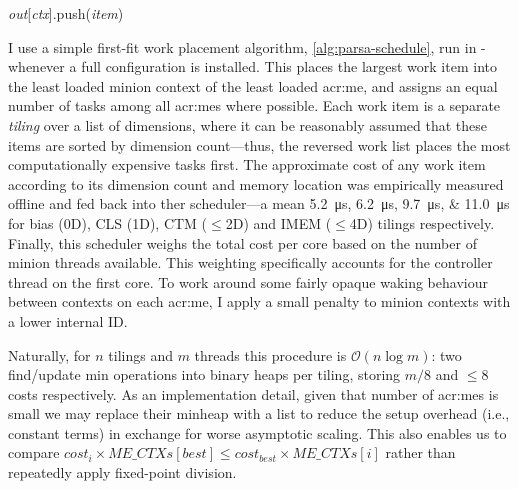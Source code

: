 \begin{algorithm}
{{			\emph{out}[\emph{ctx}].push(\emph{item})\;
		}
	}
\end{algorithm}

I use a simple first-fit work placement algorithm, \cref{alg:parsa-schedule}, run in \approachshort{}-\Coopfw{} whenever a full configuration is installed.
This places the largest work item into the least loaded minion context of the least loaded \gls{acr:me}, and assigns an equal number of tasks among all \glspl{acr:me} where possible.
Each work item is a separate \emph{tiling} over a list of dimensions, where it can be reasonably assumed that these items are sorted by dimension count---thus, the reversed work list places the most computationally expensive tasks first.
The approximate cost of any work item according to its dimension count and memory location was empirically measured offline and fed back into ther scheduler---a mean \qtylist{5.2;6.2;9.7;11.0}{\micro\second} for bias (0D), CLS (1D), CTM ($\le$2D) and IMEM ($\le$4D) tilings respectively.
Finally, this scheduler weighs the total cost per core based on the number of minion threads available.
This weighting specifically accounts for the controller thread on the first core.
To work around some fairly opaque waking behaviour between contexts on each \gls{acr:me}, I apply a small penalty to minion contexts with a lower internal ID.

Naturally, for $n$ tilings and $m$ threads this procedure is $\mathcal{O}{\left(n\log{m}\right)}$: two find/update min operations into binary heaps per tiling, storing $m/8$ and $\le8$ costs respectively.
As an implementation detail, given that number of \glspl{acr:me} is small we may replace their minheap with a list to reduce the setup overhead (i.e., constant terms) in exchange for worse asymptotic scaling.
This also enables us to compare $\textit{cost}_i \times \textit{ME\_CTXs}\left[\textit{best}\right] \le \textit{cost}_\textit{best} \times \textit{ME\_CTXs}\left[i\right]$ rather than repeatedly apply fixed-point division.


